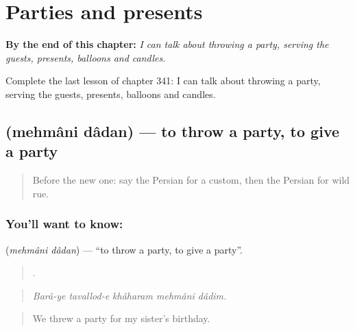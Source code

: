 
\chapter{Parties and presents}
\label{ch:fa-parties-and-presents}

\begin{chapteropening}
\textbf{By the end of this chapter:} \emph{I can talk about throwing a party, serving the guests, presents, balloons and candles.}

Complete the last lesson of chapter 341: I can talk about throwing a party, serving the guests, presents, balloons and candles.
\end{chapteropening}

\section[\texorpdfstring{\fa{مهمانی} \fa{دادن} (mehmâni dâdan)}{مهمانی دادن (mehmâni dâdan)}]{  (mehmâni dâdan) — to throw a party, to give a party}

\label{lesson:FA-C341-mehmani-dadan}



\begin{quote}
Before the new one: say the Persian for a custom, then the Persian for wild rue.
\end{quote}

\subsection*{You'll want to know:  }
\textbf{ } (\emph{mehmâni dâdan}) — \textquotedblleft{}to throw a party, to give a party\textquotedblright{}.

\begin{quote}
    .
\end{quote}

\begin{quote}
\emph{Barâ-ye tavallod-e khâharam mehmâni dâdim.}
\end{quote}

\begin{quote}
We threw a party for my sister's birthday.
\end{quote}


